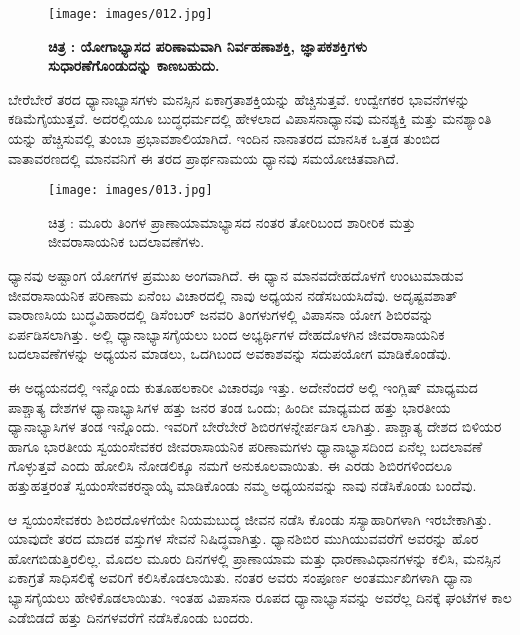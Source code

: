 \begin{figure}
\texttt{[image: images/012.jpg]}
\caption{\textbf{ಚಿತ್ರ : ಯೋಗಾಭ್ಯಾಸದ ಪರಿಣಾಮವಾಗಿ ನಿರ್ವಹಣಾಶಕ್ತಿ, ಜ್ಞಾಪಕಶಕ್ತಿಗಳು ಸುಧಾರಣೆಗೊಂಡುದನ್ನು ಕಾಣಬಹುದು.} }
\end{figure}

ಬೇರೆಬೇರೆ ತರದ ಧ್ಯಾನಾಭ್ಯಾಸಗಳು ಮನಸ್ಸಿನ ಏಕಾಗ್ರತಾಶಕ್ತಿಯನ್ನು ಹೆಚ್ಚಿಸುತ್ತವೆ. ಉದ್ವೇಗಕರ ಭಾವನೆಗಳನ್ನು ಕಡಿಮೆಗೈಯುತ್ತವೆ. ಅದರಲ್ಲಿಯೂ ಬುದ್ಧಧರ್ಮದಲ್ಲಿ ಹೇಳಲಾದ ವಿಪಾಸನಾಧ್ಯಾನವು ಮನಶ್ಯಕ್ತಿ ಮತ್ತು ಮನಶ್ಯಾಂತಿ ಯನ್ನು ಹೆಚ್ಚಿಸುವಲ್ಲಿ ತುಂಬಾ ಪ್ರಭಾವಶಾಲಿಯಾಗಿದೆ. ಇಂದಿನ ನಾನಾತರದ ಮಾನಸಿಕ ಒತ್ತಡ ತುಂಬಿದ ವಾತಾವರಣದಲ್ಲಿ ಮಾನವನಿಗೆ ಈ ತರದ ಪ್ರಾರ್ಥನಾಮಯ ಧ್ಯಾನವು ಸಮಯೋಚಿತವಾಗಿದೆ.

\begin{center}
\end{center}


\begin{figure}
\texttt{[image: images/013.jpg]}
\caption{ಚಿತ್ರ : ಮೂರು ತಿಂಗಳ ಪ್ರಾಣಾಯಾಮಾಭ್ಯಾಸದ ನಂತರ ತೋರಿಬಂದ ಶಾರೀರಿಕ ಮತ್ತು ಜೀವರಾಸಾಯನಿಕ ಬದಲಾವಣೆಗಳು.}
\end{figure}

ಧ್ಯಾನವು ಅಷ್ಟಾಂಗ ಯೋಗಗಳ ಪ್ರಮುಖ ಅಂಗವಾಗಿದೆ. ಈ ಧ್ಯಾನ ಮಾನವದೇಹದೊಳಗೆ ಉಂಟುಮಾಡುವ ಜೀವರಾಸಾಯನಿಕ ಪರಿಣಾಮ ಏನೆಂಬ ವಿಚಾರದಲ್ಲಿ ನಾವು ಅಧ್ಯಯನ ನಡೆಸಬಯಸಿದೆವು. ಅದೃಷ್ಟವಶಾತ್ ವಾರಾಣಸಿಯ ಬುದ್ಧವಿಹಾರದಲ್ಲಿ  ಡಿಸೆಂಬರ್  ಜನವರಿ ತಿಂಗಳುಗಳಲ್ಲಿ ವಿಪಾಸನಾ ಯೋಗ ಶಿಬಿರವನ್ನು ಏರ್ಪಡಿಸಲಾಗಿತ್ತು. ಅಲ್ಲಿ ಧ್ಯಾನಾಭ್ಯಾಸಗೈಯಲು ಬಂದ ಅಭ್ಯರ್ಥಿಗಳ ದೇಹದೊಳಗಿನ ಜೀವರಾಸಾಯನಿಕ ಬದಲಾವಣೆಗಳನ್ನು ಅಧ್ಯಯನ ಮಾಡಲು, ಒದಗಿಬಂದ ಅವಕಾಶವನ್ನು ಸದುಪಯೋಗ ಮಾಡಿಕೊಂಡೆವು.

ಈ ಅಧ್ಯಯನದಲ್ಲಿ ಇನ್ನೊಂದು ಕುತೂಹಲಕಾರೀ ವಿಚಾರವೂ ಇತ್ತು. ಅದೇನೆಂದರೆ ಅಲ್ಲಿ ಇಂಗ್ಲಿಷ್ ಮಾಧ್ಯಮದ ಪಾಶ್ಚಾತ್ಯ ದೇಶಗಳ ಧ್ಯಾನಾಭ್ಯಾಸಿಗಳ ಹತ್ತು ಜನರ ತಂಡ ಒಂದು; ಹಿಂದೀ ಮಾಧ್ಯಮದ ಹತ್ತು ಭಾರತೀಯ ಧ್ಯಾನಾಭ್ಯಾಸಿಗಳ ತಂಡ ಇನ್ನೊಂದು. ಇವರಿಗೆ ಬೇರೆಬೇರೆ ಶಿಬಿರಗಳನ್ನೇರ್ಪಡಿಸ ಲಾಗಿತ್ತು. ಪಾಶ್ಚಾತ್ಯ ದೇಶದ ಬಿಳಿಯರ ಹಾಗೂ ಭಾರತೀಯ ಸ್ವಯಂಸೇವಕರ ಜೀವರಾಸಾಯನಿಕ ಪರಿಣಾಮಗಳು ಧ್ಯಾನಾಭ್ಯಾಸದಿಂದ ಏನೆಲ್ಲ ಬದಲಾವಣೆ ಗೊಳ್ಳುತ್ತವೆ ಎಂದು ಹೋಲಿಸಿ ನೋಡಲಿಕ್ಕೂ ನಮಗೆ ಅನುಕೂಲವಾಯಿತು. ಈ ಎರಡು ಶಿಬಿರಗಳಿಂದಲೂ ಹತ್ತುಹತ್ತರಂತೆ ಸ್ವಯಂಸೇವಕರನ್ನಾಯ್ಕೆ ಮಾಡಿಕೊಂಡು ನಮ್ಮ ಅಧ್ಯಯನವನ್ನು ನಾವು ನಡೆಸಿಕೊಂಡು ಬಂದೆವು.

ಆ ಸ್ವಯಂಸೇವಕರು ಶಿಬಿರದೊಳಗೆಯೇ ನಿಯಮಬುದ್ಧ ಜೀವನ ನಡೆಸಿ ಕೊಂಡು ಸಸ್ಯಾಹಾರಿಗಳಾಗಿ ಇರಬೇಕಾಗಿತ್ತು. ಯಾವುದೇ ತರದ ಮಾದಕ ವಸ್ತುಗಳ ಸೇವನೆ ನಿಷಿದ್ಧವಾಗಿತ್ತು. ಧ್ಯಾನಶಿಬಿರ ಮುಗಿಯುವವರೆಗೆ ಅವರನ್ನು ಹೊರ ಹೋಗಬಿಡುತ್ತಿರಲಿಲ್ಲ. ಮೊದಲ ಮೂರು ದಿನಗಳಲ್ಲಿ ಪ್ರಾಣಾಯಾಮ ಮತ್ತು ಧಾರಣಾವಿಧಾನಗಳನ್ನು ಕಲಿಸಿ, ಮನಸ್ಸಿನ ಏಕಾಗ್ರತೆ ಸಾಧಿಸಲಿಕ್ಕೆ ಅವರಿಗೆ ಕಲಿಸಿಕೊಡಲಾಯಿತು. ನಂತರ ಅವರು ಸಂಪೂರ್ಣ ಅಂತರ್ಮುಖಿಗಳಾಗಿ ಧ್ಯಾನಾ ಭ್ಯಾಸಗೈಯಲು ಹೇಳಿಕೊಡಲಾಯಿತು. ಇಂತಹ ವಿಪಾಸನಾ ರೂಪದ ಧ್ಯಾನಾಭ್ಯಾಸವನ್ನು ಅವರೆಲ್ಲ ದಿನಕ್ಕೆ  ಘಂಟೆಗಳ ಕಾಲ ಎಡೆಬಿಡದೆ ಹತ್ತು ದಿನಗಳವರೆಗೆ ನಡೆಸಿಕೊಂಡು ಬಂದರು.

